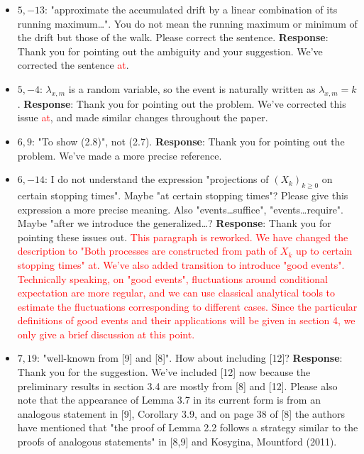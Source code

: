 \documentclass[11pt,a4paper]{article}
\numberwithin{equation}{section}
\def\TBF#1{\textcolor{red}{#1}} %
\begin{document}
\begin{itemize}
		
		\item 
		$5,-13$: "approximate the accumulated drift by a linear combination of its running maximum\dots". You do not mean the running maximum or minimum of the drift but those of the walk. Please correct the sentence.
		\subitem \textbf{Response}:
		Thank you for pointing out the ambiguity and your suggestion. We've corrected the sentence \TBF{at}.
		
		
		\item 
		$5,-4$: $\lambda_{x,m}$ is a random variable, so the event is naturally written as $\lambda_{x,m} = k$.
		\subitem \textbf{Response}:
		Thank you for pointing out the problem. We've corrected this issue \TBF{at}, and made similar changes throughout the paper.
		
		\item 
		$6,9$: "To show (2.8)", not (2.7).
		\subitem \textbf{Response}:
		Thank you for pointing out the problem. We've made a more precise reference.
		
		\item 
		$6,-14$: I do not understand the expression "projections of $(X_k)_{k\geq 0}$ on certain stopping times". Maybe "at certain stopping times"? Please give this expression a more precise meaning. Also "events\dots suffice", "events\dots require". Maybe "after we introduce the generalized\dots?
		\subitem \textbf{Response}:
		Thank you for pointing these issues out. \TBF{This paragraph is reworked. We have changed the description to "Both processes are constructed from path of $X_k$ up to certain stopping times" \TBF{at}. We've also added transition to introduce "good events". Technically speaking, on "good events", fluctuations around conditional expectation are more regular, and we can use classical analytical tools to estimate the fluctuations corresponding to different cases. Since the particular definitions of good events and their applications will be given in section 4, we only give a brief discussion at this point.}
		
		\item 
		$7,19$: "well-known from [9] and [8]". How about including [12]?
		\subitem \textbf{Response}: Thank you for the suggestion. We've included [12] now because the preliminary results in section 3.4 are mostly from [8] and [12].
		Please also note that the appearance of Lemma 3.7 in its current form is from an analogous statement in [9], Corollary 3.9, and on page 38 of [8] the authors have mentioned that "the proof of Lemma 2.2 follows a strategy similar to the proofs of analogous statements" in [8,9] and Kosygina, Mountford (2011).
		

\end{itemize}
\end{document}
